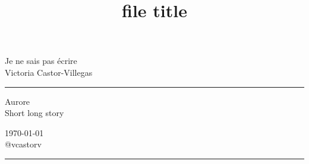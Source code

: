 {\setlength{\parindent}{0pt}
\title{file title} %
\fancyhead[C]{}
\begin{minipage}{0.295\textwidth} %
\raggedright
Je ne sais pas écrire\\ %
\footnotesize %
Victoria Castor-Villegas %
\medskip\hrule
\end{minipage}
\begin{minipage}{0.4\textwidth} %
\centering 
\large %
Aurore\\ %
\normalsize %
Short long story\\ %
\end{minipage}
\begin{minipage}{0.295\textwidth} %
\raggedleft
\today\\ %
\footnotesize %
@vcastorv %
\medskip\hrule
\end{minipage}
}

